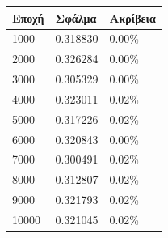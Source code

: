 \begin{center}
\begin{tabular}{|l|l|l|}
\hline
\textbf{Εποχή} & \textbf{Σφάλμα} & \textbf{Ακρίβεια} \\ \hline
1000		   & 0.318830        & 0.00\%            \\ \hline
2000		   & 0.326284        & 0.00\%            \\ \hline
3000		   & 0.305329        & 0.00\%            \\ \hline
4000		   & 0.323011        & 0.02\%            \\ \hline
5000		   & 0.317226        & 0.02\%            \\ \hline
6000		   & 0.320843        & 0.00\%            \\ \hline
7000		   & 0.300491        & 0.02\%            \\ \hline
8000		   & 0.312807        & 0.02\%            \\ \hline
9000		   & 0.321793        & 0.02\%            \\ \hline
10000		   & 0.321045        & 0.02\%            \\ \hline
\end{tabular}
\end{center}
 \label{tab:title}

